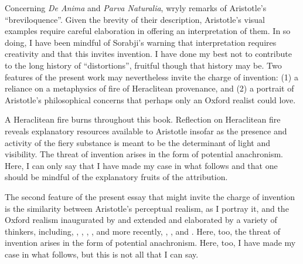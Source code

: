 Concerning \emph{De Anima} and \emph{Parva Naturalia}, \citet[vii]{Hammond:1902kx} wryly remarks of Aristotle's ``breviloquence''. Given the brevity of their description, Aristotle's visual examples require careful elaboration in offering an interpretation of them. In so doing, I have been mindful of Sorabji's \citeyearpar[225]{Sorabji:2003fk} warning that interpretation requires creativity and that this invites invention. I have done my best not to contribute to the long history of ``distortions'', fruitful though that history may be. Two features of the present work may nevertheless invite the charge of invention: (1) a reliance on a metaphysics of fire of Heraclitean provenance, and (2) a portrait of Aristotle's philosophical concerns that perhaps only an Oxford realist could love. 

A Heraclitean fire burns throughout this book. Reflection on Heraclitean fire reveals explanatory resources available to Aristotle insofar as the presence and activity of the fiery substance is meant to be the determinant of light and visibility. The threat of invention arises in the form of potential anachronism. Here, I can only say that I have made my case in what follows and that one should be mindful of the explanatory fruits of the attribution. 

The second feature of the present essay that might invite the charge of invention is the similarity between Aristotle's perceptual realism, as I portray it, and the Oxford realism inaugurated by \citet{Cook-Wilson:1926sf} and extended and elaborated by a variety of thinkers, including, \citet{Prichard:1909yg,Prichard:1950kx}, \citet{Ryle:1949qr}, \citet{Austin:1961bs,Austin:1962lr}, \citet{Hinton:1973js}, and more recently, \citet{McDowell:1994am}, \citet{Travis:2008la}, and \citet{Williamson:2000lr}. Here, too, the threat of invention arises in the form of potential anachronism. Here, too, I have made my case in what follows, but this is not all that I can say. 

